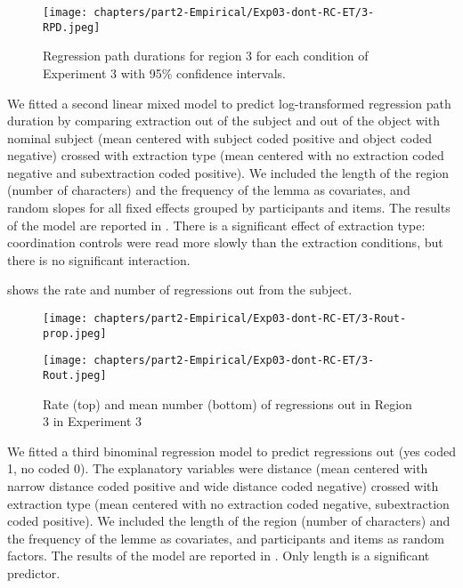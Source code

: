 \begin{figure}
    \centering
    \texttt{[image: chapters/part2-Empirical/Exp03-dont-RC-ET/3-RPD.jpeg]}
    \caption{Regression path durations for region 3 for each condition of Experiment 3 with 95\% confidence intervals.}
    \label{fig:exp03-3-RPD}
\end{figure}

We fitted a second linear mixed model to predict log-transformed regression path duration by comparing extraction out of the subject and out of the object with nominal subject (mean centered with subject coded positive and object coded negative) crossed with extraction type (mean centered with no extraction coded negative and subextraction coded positive). We included the length of the region (number of characters) and the frequency of the lemma as covariates, and random slopes for all fixed effects grouped by participants and items. 
The results of the model are reported in . There is a significant effect of extraction type: coordination controls were read more slowly than the extraction conditions, but there is no significant interaction.



 shows the rate and number of regressions out from the subject. 

\begin{figure}
    \centering
    \texttt{[image: chapters/part2-Empirical/Exp03-dont-RC-ET/3-Rout-prop.jpeg]}
    
    \texttt{[image: chapters/part2-Empirical/Exp03-dont-RC-ET/3-Rout.jpeg]}
    \caption{Rate (top) and mean number (bottom) of regressions out in Region 3 in Experiment 3}
    \label{fig:exp03-3-Rout-prop}
\end{figure}

We fitted a third binominal regression model to predict regressions out (yes coded 1, no coded 0). The explanatory variables were distance (mean centered with narrow distance coded positive and wide distance coded negative) crossed with extraction type (mean centered with no extraction coded negative, subextraction coded positive). We included the length of the region (number of characters) and the frequency of the lemme as covariates, and participants and items as random factors. 
The results of the model are reported in . Only length is a significant predictor.\largerpage[-1]

